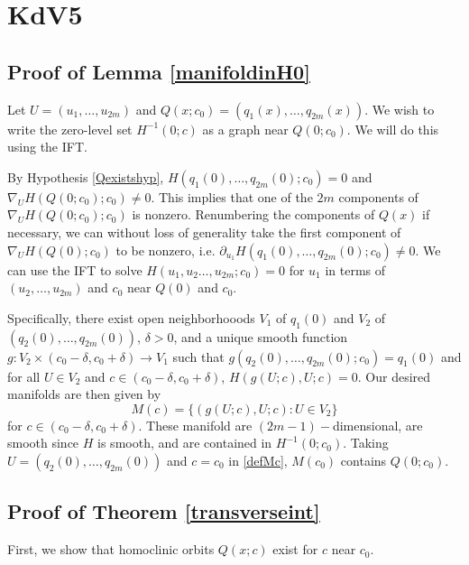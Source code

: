 \documentclass[thesis.tex]{subfiles}
\begin{document}
\iffulldocument\else
	\chapter{KdV5}
\fi

\section{Proof of Lemma \ref{manifoldinH0}}

Let $U = (u_1, \dots, u_{2m})$ and $Q(x; c_0) = (q_1(x), \dots, q_{2m}(x))$. We wish to write the zero-level set $H^{-1}(0; c)$ as a graph near $Q(0; c_0)$. We will do this using the IFT.

By Hypothesis \ref{Qexistshyp}, $H(q_1(0), \dots, q_{2m}(0); c_0) = 0$ and $\nabla_U H(Q(0; c_0); c_0) \neq 0$. This implies that one of the $2m$ components of $\nabla_U H(Q(0; c_0); c_0)$ is nonzero. Renumbering the components of $Q(x)$ if necessary, we can without loss of generality take the first component of $\nabla_U H(Q(0); c_0)$ to be nonzero, i.e. $\partial_{u_1}H(q_1(0), \dots, q_{2m}(0); c_0) \neq 0$. We can use the IFT to solve $H(u_1, u_2 \dots, u_{2m}; c_0) = 0$ for $u_1$ in terms of $(u_2, \dots, u_{2m})$ and $c_0$ near $Q(0)$ and $c_0$.

Specifically, there exist open neighborhooods $V_1$ of $q_1(0)$ and $V_2$ of $(q_2(0), \dots, q_{2m}(0))$, $\delta > 0$, and a unique smooth function $g: V_2 \times (c_0 - \delta, c_0 + \delta) \rightarrow V_1$ such that $g(q_2(0), \dots, q_{2m}(0); c_0) = q_1(0)$ and for all $U \in V_2$ and $c \in (c_0 - \delta, c_0 + \delta)$, $H(g(U; c),U; c) = 0$. Our desired manifolds are then given by
\begin{equation}\label{defMc}
M(c) = \{ (g(U; c), U; c) : U \in V_2 \}
\end{equation}
for $c \in (c_0 - \delta, c_0 + \delta)$. These manifold are $(2m-1)-$dimensional, are smooth since $H$ is smooth, and are contained in $H^{-1}(0; c_0)$. Taking $U = (q_2(0), \dots, q_{2m}(0))$ and $c = c_0$ in \eqref{defMc}, $M(c_0)$ contains $Q(0; c_0)$.

\section{Proof of Theorem \ref{transverseint}}

First, we show that homoclinic orbits $Q(x; c)$ exist for $c$ near $c_0$.
\end{document}
